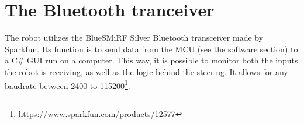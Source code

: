 \section{The Bluetooth tranceiver}
The robot utilizes the BlueSMiRF Silver Bluetooth transceiver made by Sparkfun. Its function is to send data from the MCU (see the software section) to a C\# GUI run on a computer. This way, it is possible to monitor both the inputs the robot is receiving, as well as the logic behind the steering. It allows for any baudrate between 2400 to 115200\footnote{https://www.sparkfun.com/products/12577}. 
